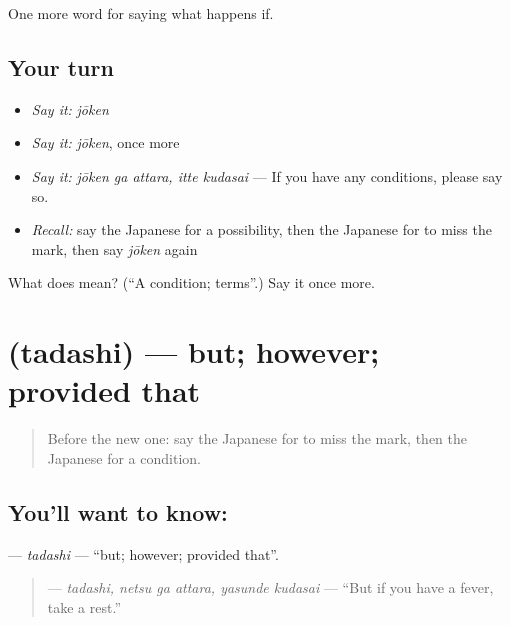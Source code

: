 \begin{grammarlens}[title={What you've built}]
One more word for saying what happens if.
\end{grammarlens}

\subsection*{Your turn}
\begin{itemize}
\raggedright
  \item \emph{Say it:} \emph{jōken}
  \item \emph{Say it:} \emph{jōken}, once more
  \item \emph{Say it:} \emph{jōken ga attara, itte kudasai} — If you have any conditions, please say so.
  \item \emph{Recall:} say the Japanese for a possibility, then the Japanese for to miss the mark, then say \emph{jōken} again
\end{itemize}

\begin{tcolorbox}[breakable,colback=teal!4,colframe=teal!35!black,title={Before you move on}]
What does  mean? (\textquotedblleft{}A condition; terms\textquotedblright{}.) Say it once more.
\end{tcolorbox}
\section[\texorpdfstring{\ja{ただし} (tadashi)}{ただし (tadashi)}]{ (tadashi) — but; however; provided that}

\label{lesson:JA-C356-tadashi}



\begin{quote}
Before the new one: say the Japanese for to miss the mark, then the Japanese for a condition.
\end{quote}

\subsection*{You'll want to know: }
\textbf{} — \emph{tadashi} — \textquotedblleft{}but; however; provided that\textquotedblright{}.

\begin{quote}
\textbf{  } — \emph{tadashi, netsu ga attara, yasunde kudasai} — \textquotedblleft{}But if you have a fever, take a rest.\textquotedblright{}
\end{quote}

